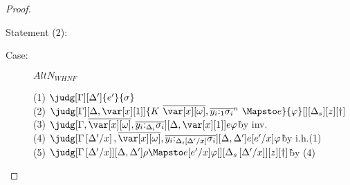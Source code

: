\begin{proof}
\begin{description}


\end{description}

Statement (2):




\begin{description}
\item[Case:] $AltN_{WHNF}$
\begin{tabbing}
    (1) $\judg[\G][\D']{e'}{\s}$\\
    (2) $\judg[\G][\D,\xl]{\konstructor~\Mapsto e}{\vp}[][\D_s][z][\dag]$\\
    (3) $\judg[\G,\ov{\xo},\ov{y_i{:}_{\D_i}\s_i}][\D,\xl]{e}{\vp}$\`by inv.\\
    (4) $\judg[\subst{\G}{\D'}{x},\ov{\xo},\ov{y_i{:}_{\subst{\D_i}{\D'}{x}}\s_i}][\D,\D']{e[e'/x]}{\vp}$\` by i.h.(1)\\
    (5) $\judg[\subst{\G}{\D'}{x}][\D,\D']{\rho \Mapsto e[e'/x]}{\vp}[][\subst{\D_s}{\D'}{x}][z][\dag]$\` by (4)\\
\end{tabbing}


\end{description}
\end{proof}
